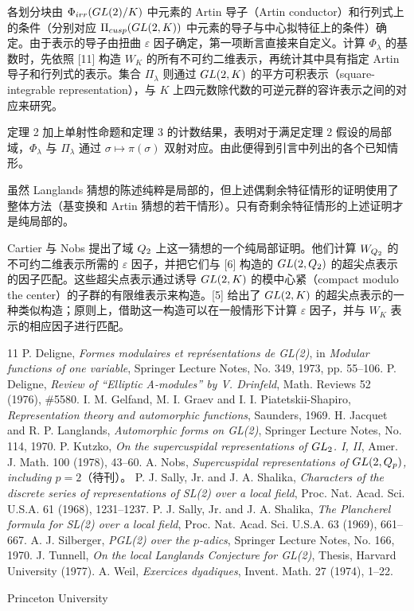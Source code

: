 各划分块由 $\Phi_{irr}(GL(2)/K)$ 中元素的 Artin 导子（Artin conductor）和行列式上的条件（分别对应 $\Pi_{cusp}(GL(2,K))$ 中元素的导子与中心拟特征上的条件）确定。由于表示的导子由扭曲 $\varepsilon$ 因子确定，第一项断言直接来自定义。计算 $\Phi_\lambda$ 的基数时，先依照 [11] 构造 $W_K$ 的所有不可约二维表示，再统计其中具有指定 Artin 导子和行列式的表示。集合 $\Pi_\lambda$ 则通过 $GL(2,K)$ 的平方可积表示（square-integrable representation），与 $K$ 上四元数除代数的可逆元群的容许表示之间的对应来研究。

定理 2 加上单射性命题和定理 3 的计数结果，表明对于满足定理 2 假设的局部域，$\Phi_\lambda$ 与 $\Pi_\lambda$ 通过 $\sigma\mapsto\pi(\sigma)$ 双射对应。由此便得到引言中列出的各个已知情形。

虽然 Langlands 猜想的陈述纯粹是局部的，但上述偶剩余特征情形的证明使用了整体方法（基变换和 Artin 猜想的若干情形）。只有奇剩余特征情形的上述证明才是纯局部的。

Cartier 与 Nobs 提出了域 $Q_2$ 上这一猜想的一个纯局部证明。他们计算 $W_{Q_2}$ 的不可约二维表示所需的 $\varepsilon$ 因子，并把它们与 [6] 构造的 $GL(2,Q_2)$ 的超尖点表示的因子匹配。这些超尖点表示通过诱导 $GL(2,K)$ 的模中心紧（compact modulo the center）的子群的有限维表示来构造。[5] 给出了 $GL(2,K)$ 的超尖点表示的一种类似构造；原则上，借助这一构造可以在一般情形下计算 $\varepsilon$ 因子，并与 $W_K$ 表示的相应因子进行匹配。

\begin{thebibliography}{11}
 P. Deligne, \emph{Formes modulaires et représentations de GL(2)}, in \emph{Modular functions of one variable}, Springer Lecture Notes, No. 349, 1973, pp. 55--106.
 P. Deligne, \emph{Review of ``Elliptic A-modules'' by V. Drinfeld}, Math. Reviews 52 (1976), \#5580.
 I. M. Gelfand, M. I. Graev and I. I. Piatetskii-Shapiro, \emph{Representation theory and automorphic functions}, Saunders, 1969.
 H. Jacquet and R. P. Langlands, \emph{Automorphic forms on GL(2)}, Springer Lecture Notes, No. 114, 1970.
 P. Kutzko, \emph{On the supercuspidal representations of $GL_2$. I, II}, Amer. J. Math. 100 (1978), 43--60.
 A. Nobs, \emph{Supercuspidal representations of $GL(2,Q_p)$, including $p=2$}（待刊）。
 P. J. Sally, Jr. and J. A. Shalika, \emph{Characters of the discrete series of representations of SL(2) over a local field}, Proc. Nat. Acad. Sci. U.S.A. 61 (1968), 1231--1237.
 P. J. Sally, Jr. and J. A. Shalika, \emph{The Plancherel formula for SL(2) over a local field}, Proc. Nat. Acad. Sci. U.S.A. 63 (1969), 661--667.
 A. J. Silberger, \emph{PGL(2) over the $p$-adics}, Springer Lecture Notes, No. 166, 1970.
 J. Tunnell, \emph{On the local Langlands Conjecture for GL(2)}, Thesis, Harvard University (1977).
 A. Weil, \emph{Exercices dyadiques}, Invent. Math. 27 (1974), 1--22.
\end{thebibliography}
\begin{flushleft}\small Princeton University\end{flushleft}

